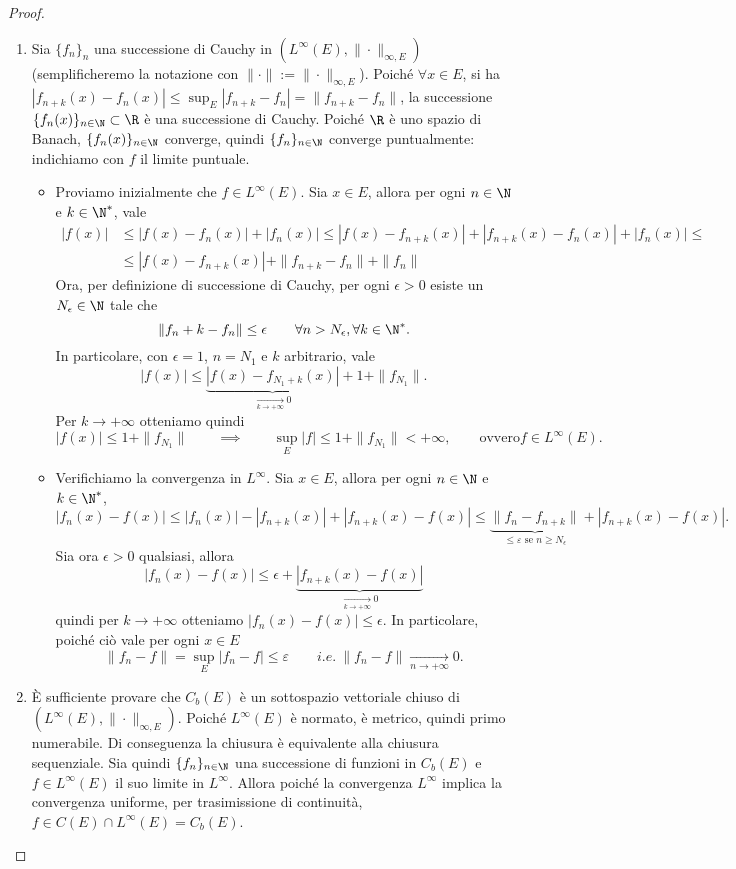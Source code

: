 \begin{proof}
    \begin{enumerate}
        \item Sia $\{f_n\}_n$ una successione di Cauchy in $(L^\infty(E), \|\cdot\|_{\infty,E})$ (semplificheremo la notazione con $\|\cdot\|:=\|\cdot\|_{\infty, E}$). Poiché $\forall x \in E$, si ha $|f_{n+k}(x)-f_n(x)|\leq \sup_E|f_{n+k}-f_n| = \|f_{n+k}-f_n\|$, la successione $\{f_n(x)\}_{n\in \N}\subset \R$ è una successione di Cauchy. Poiché $\R$ è uno spazio di Banach, $\{f_n(x)\}_{n\in \N}$ converge, quindi $\{f_n\}_{n\in\N}$ converge puntualmente: indichiamo con $f$ il limite puntuale.
        \begin{itemize}
            \item Proviamo inizialmente che $f\in L^\infty(E)$. Sia $x\in E$, allora per ogni $n\in \N$ e $k\in \N^*$, vale
            \begin{align*}
                |f(x)|&\leq |f(x)-f_n(x)|+|f_n(x)|\leq |f(x)-f_{n+k}(x)| + |f_{n+k}(x)-f_n(x)| + |f_n(x)| \leq \\ &\leq |f(x)-f_{n+k}(x)| + \|f_{n+k}-f_n\| + \|f_n\|
            \end{align*}
            Ora, per definizione di successione di Cauchy, per ogni $\epsilon >0$ esiste un $N_\epsilon\in \N$ tale che 
            \[\|f_n+k -f_n\|\leq \epsilon \qquad \forall n > N_\epsilon, \forall k\in \N^*.\]
            In particolare, con $\epsilon = 1$, $n = N_1$ e $k$ arbitrario, vale
            \[|f(x)|\leq \underbrace{|f(x)-f_{N_1+k}(x)|}_{\xrightarrow[k\to +\infty]{}0} + 1 + \|f_{N_1}\|.\]
            Per $k\to +\infty$ otteniamo quindi 
            \[|f(x)|\leq 1 + \|f_{N_1}\|\qquad \implies \qquad \sup_E|f| \leq 1 + \|f_{N_1}\|<+\infty, \qquad \text{ovvero} f\in L^\infty(E).\]
            \item Verifichiamo la convergenza in $L^\infty$. Sia $x\in E$, allora per ogni $n\in \N$ e $k\in \N^*$, 
            \[|f_n(x)-f(x)|\leq |f_n(x)|-|f_{n+k}(x)| + |f_{n+k}(x)-f(x)| \leq \underbrace{\|f_n-f_{n+k}\|}_{\leq \varepsilon \text{ se }n\geq N_\epsilon} + |f_{n+k}(x)-f(x)|.\]
            Sia ora $\epsilon >0$ qualsiasi, allora 
            \[|f_n(x)-f(x)|\leq \epsilon + \underbrace{|f_{n+k}(x)-f(x)|}_
            {\xrightarrow[k\to +\infty]{}0}\]
            quindi per $k\to +\infty$ otteniamo $|f_n(x)-f(x)|\leq \epsilon$. In particolare, poiché ciò vale per ogni $x\in E$ 
            \[\|f_n-f\| = \sup_E |f_n-f|\leq \varepsilon\qquad i.e.\ \|f_n-f\|\xrightarrow[n\to +\infty]{}0.\] 
        \end{itemize}
        \item È sufficiente provare che $C_b(E)$ è un sottospazio vettoriale chiuso di $(L^\infty(E), \|\cdot\|_{\infty,E})$. Poiché $L^\infty(E)$ è normato, è metrico, quindi primo numerabile. Di conseguenza la chiusura è equivalente alla chiusura sequenziale. Sia quindi $\{f_n\}_{n\in \N}$ una successione di funzioni in $C_b(E)$ e $f\in L^\infty(E)$ il suo limite in $L^\infty$. Allora poiché la convergenza $L^\infty$ implica la convergenza uniforme, per trasimissione di continuità, $f\in C(E)\cap L^\infty(E) = C_b(E)$.
    \end{enumerate}
\end{proof}
